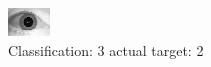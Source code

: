 \begin{figure}[h!]
\begin{center}
\includegraphics[width=0.60\columnwidth]{figures/ID1678_class_3_target_2.png}
\end{center}
\caption{ Classification: 3 actual target: 2}
\label{fig:ID1678_class_3_target_2}
\end{figure}
